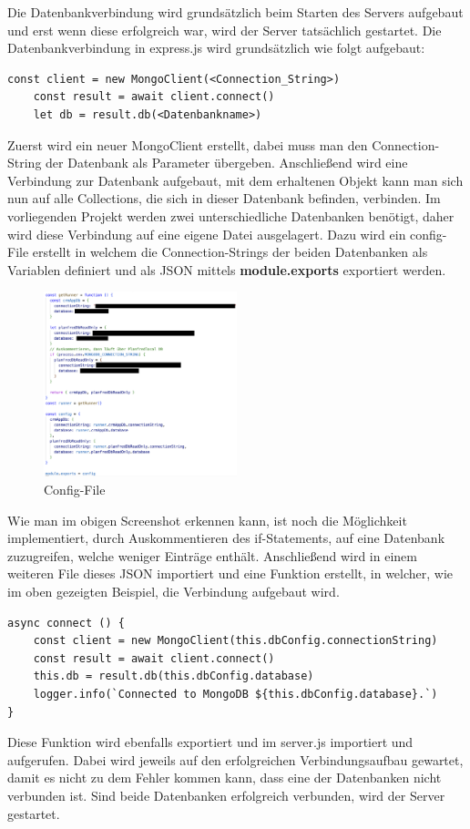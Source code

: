 Die Datenbankverbindung wird grundsätzlich beim Starten des Servers aufgebaut und erst wenn diese erfolgreich war, wird der Server tatsächlich gestartet. Die Datenbankverbindung in express.js wird grundsätzlich wie folgt aufgebaut:
\begin{lstlisting}[caption=Erstellen einer Datenbankverbindung in express.js]
    const client = new MongoClient(<Connection_String>)
    const result = await client.connect()
    let db = result.db(<Datenbankname>)
\end{lstlisting}
Zuerst wird ein neuer MongoClient erstellt, dabei muss man den Connection-String der Datenbank als Parameter übergeben. Anschließend wird eine Verbindung zur Datenbank aufgebaut, mit dem erhaltenen Objekt kann man sich nun auf alle Collections, die sich in dieser Datenbank befinden, verbinden. Im vorliegenden Projekt werden zwei unterschiedliche Datenbanken benötigt, daher wird diese Verbindung auf eine eigene Datei ausgelagert.
\newline
Dazu wird ein config-File erstellt in welchem die Connection-Strings der beiden Datenbanken als Variablen definiert und als JSON mittels \textbf{module.exports} exportiert werden.
\newline
\begin{figure}[h!]
    \centering
    \includegraphics[width=0.5\textwidth]{pics/config-file-conn-strings.png}
    \caption{Config-File}
    \label{fig:enter-label}
\end{figure}
\newline
Wie man im obigen Screenshot erkennen kann, ist noch die Möglichkeit implementiert, durch Auskommentieren des if-Statements, auf eine Datenbank zuzugreifen, welche weniger Einträge enthält.
\newline
Anschließend wird in einem weiteren File dieses JSON importiert und eine Funktion erstellt, in welcher, wie im oben gezeigten Beispiel, die Verbindung aufgebaut wird.
\begin{lstlisting}
async connect () {
    const client = new MongoClient(this.dbConfig.connectionString)
    const result = await client.connect()
    this.db = result.db(this.dbConfig.database)
    logger.info(`Connected to MongoDB ${this.dbConfig.database}.`)
}
\end{lstlisting}
Diese Funktion wird ebenfalls exportiert und im server.js importiert und aufgerufen. Dabei wird jeweils auf den erfolgreichen Verbindungsaufbau gewartet, damit es nicht zu dem Fehler kommen kann, dass eine der Datenbanken nicht verbunden ist. Sind beide Datenbanken erfolgreich verbunden, wird der Server gestartet.